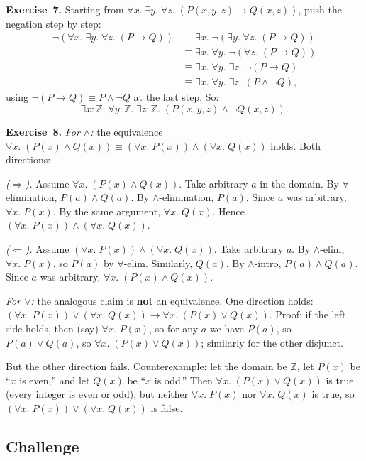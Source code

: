 \documentclass[11pt]{article}
\begin{document}
\medskip
\textbf{Exercise~7.}
Starting from $\forall x.\;\exists y.\;\forall z.\;(P(x,y,z) \to Q(x,z))$, push the negation step by step:
\begin{align*}
\lnot(\forall x.\;\exists y.\;\forall z.\;(P \to Q))
  &\equiv \exists x.\;\lnot(\exists y.\;\forall z.\;(P \to Q)) \\
  &\equiv \exists x.\;\forall y.\;\lnot(\forall z.\;(P \to Q)) \\
  &\equiv \exists x.\;\forall y.\;\exists z.\;\lnot(P \to Q) \\
  &\equiv \exists x.\;\forall y.\;\exists z.\;(P \wedge \lnot Q),
\end{align*}
using $\lnot(P \to Q) \equiv P \wedge \lnot Q$ at the last step. So:
\[
  \exists x : \mathbb{Z}.\;\forall y : \mathbb{Z}.\;\exists z : \mathbb{Z}.\;(P(x,y,z) \wedge \lnot Q(x, z)).
\]

\medskip
\textbf{Exercise~8.}
\emph{For $\wedge$:} the equivalence $\forall x.\;(P(x) \wedge Q(x)) \equiv (\forall x.\; P(x)) \wedge (\forall x.\; Q(x))$ holds. Both directions:

\emph{($\Rightarrow$).} Assume $\forall x.\;(P(x) \wedge Q(x))$. Take arbitrary $a$ in the domain. By $\forall$-elimination, $P(a) \wedge Q(a)$. By $\wedge$-elimination, $P(a)$. Since $a$ was arbitrary, $\forall x.\;P(x)$. By the same argument, $\forall x.\;Q(x)$. Hence $(\forall x.\;P(x)) \wedge (\forall x.\;Q(x))$.

\emph{($\Leftarrow$).} Assume $(\forall x.\;P(x)) \wedge (\forall x.\;Q(x))$. Take arbitrary $a$. By $\wedge$-elim, $\forall x.\;P(x)$, so $P(a)$ by $\forall$-elim. Similarly, $Q(a)$. By $\wedge$-intro, $P(a) \wedge Q(a)$. Since $a$ was arbitrary, $\forall x.\;(P(x) \wedge Q(x))$.

\emph{For $\vee$:} the analogous claim is \textbf{not} an equivalence. One direction holds: $(\forall x.\;P(x)) \vee (\forall x.\;Q(x)) \to \forall x.\;(P(x) \vee Q(x))$. Proof: if the left side holds, then (say) $\forall x.\;P(x)$, so for any $a$ we have $P(a)$, so $P(a) \vee Q(a)$, so $\forall x.\;(P(x) \vee Q(x))$; similarly for the other disjunct.

But the other direction fails. Counterexample: let the domain be $\mathbb{Z}$, let $P(x)$ be ``$x$ is even,'' and let $Q(x)$ be ``$x$ is odd.'' Then $\forall x.\;(P(x) \vee Q(x))$ is true (every integer is even or odd), but neither $\forall x.\; P(x)$ nor $\forall x.\; Q(x)$ is true, so $(\forall x.\;P(x)) \vee (\forall x.\;Q(x))$ is false.

\subsection*{Challenge}
\end{document}
